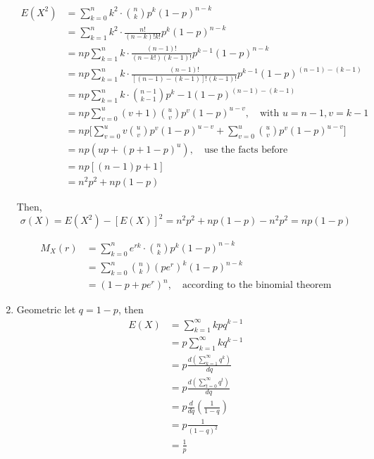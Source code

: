 \documentclass[UTF8]{article}
\begin{document}
\begin{enumerate}
        \begin{equation*}
            \begin{split}
                E(X^2) &= \sum^n_{k=0}k^2\cdot\binom{n}{k}p^k(1-p)^{n-k}\\
                &= \sum^n_{k=1}k^2\cdot\frac{n!}{(n-k)!k!}p^k(1-p)^{n-k}\\
                &= np\sum^n_{k=1}k\cdot\frac{(n-1)!}{(n-k!)(k-1)!}p^{k-1}(1-p)^{n-k}\\
                &=np\sum^n_{k=1}k\cdot\frac{(n-1)!}{[(n-1)-(k-1)]!(k-1)!}p^{k-1}(1-p)^{(n-1)-(k-1)}\\
                &=np\sum^n_{k=1}k\cdot\binom{n-1}{k-1}p^k-1(1-p)^{(n-1)-(k-1)}\\
                &=np\sum^u_{v=0}(v+1)\binom{u}{v}p^v(1-p)^{u-v},\quad\text{with $u=n-1,v=k-1$}\\
                &=np\bigg[\sum^u_{v=0}v\binom{u}{v}p^v(1-p)^{u-v}+\sum^u_{v=0}\binom{u}{v}p^v(1-p)^{u-v}\bigg]\\
                &=np(up+(p+1-p)^u),\quad\text{use the facts before}\\
                &=np[(n-1)p+1]\\
                &=n^2p^2+np(1-p)
            \end{split}
        \end{equation*}

        Then,
        \begin{equation*}
            \sigma(X)=E(X^2)-[E(X)]^2=n^2p^2+np(1-p)-n^2p^2=np(1-p)
        \end{equation*}

        \begin{equation*}
            \begin{split}
                M_X(r) &= \sum^n_{k=0}e^{rk}\cdot\binom{n}{k}p^k(1-p)^{n-k}\\
                &=\sum^n_{k=0}\binom{n}{k}(pe^r)^k(1-p)^{n-k}\\
                &=(1-p+pe^r)^n,\quad\text{according to the binomial theorem}
            \end{split}
        \end{equation*}

        \item Geometric
        let $q=1-p$, then 
        \begin{equation*}
            \begin{split}
                E(X) &=\sum^\infty_{k=1}kpq^{k-1}\\
                &=p\sum^\infty_{k=1}kq^{k-1}\\
                &=p\frac{d(\sum^\infty_{k=1}q^k)}{dq}\\
                &=p\frac{d(\sum^\infty_{t=0}q^t)}{dq}\\
                &=p\frac{d}{dq}(\frac{1}{1-q})\\
                &=p\frac{1}{(1-q)^2}\\
                &=\frac{1}{p}
            \end{split}
        \end{equation*}


\end{enumerate}
\end{document}
